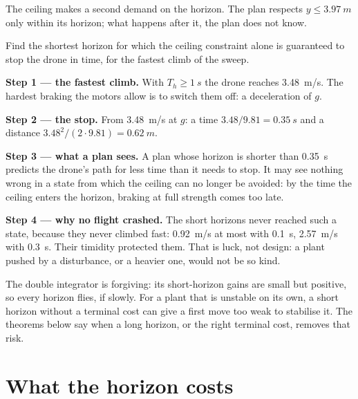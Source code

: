 The ceiling makes a second demand on the horizon. The plan respects $y \le \SI{3.97}{m}$ only within its horizon; what happens after it, the plan does not know.

\begin{example}
\label{ex:horizon-brake}
Find the shortest horizon for which the ceiling constraint alone is guaranteed to stop the drone in time, for the fastest climb of the sweep.

\textbf{Step 1 — the fastest climb.} With $T_h \ge \SI{1}{s}$ the drone reaches \SI{3.48}{m/s}. The hardest braking the motors allow is to switch them off: a deceleration of $g$.

\textbf{Step 2 — the stop.} From \SI{3.48}{m/s} at $g$: a time $3.48/9.81 = \SI{0.35}{s}$ and a distance $3.48^2/(2 \cdot 9.81) = \SI{0.62}{m}$.

\textbf{Step 3 — what a plan sees.} A plan whose horizon is shorter than \SI{0.35}{s} predicts the drone's path for less time than it needs to stop. It may see nothing wrong in a state from which the ceiling can no longer be avoided: by the time the ceiling enters the horizon, braking at full strength comes too late.

\textbf{Step 4 — why no flight crashed.} The short horizons never reached such a state, because they never climbed fast: \SI{0.92}{m/s} at most with \SI{0.1}{s}, \SI{2.57}{m/s} with \SI{0.3}{s}. Their timidity protected them. That is luck, not design: a plant pushed by a disturbance, or a heavier one, would not be so kind.
\end{example}

\begin{watchout}
The double integrator is forgiving: its short-horizon gains are small but positive, so every horizon flies, if slowly. For a plant that is unstable on its own, a short horizon without a terminal cost can give a first move too weak to stabilise it. The theorems below say when a long horizon, or the right terminal cost, removes that risk.
\end{watchout}

\section{What the horizon costs}

